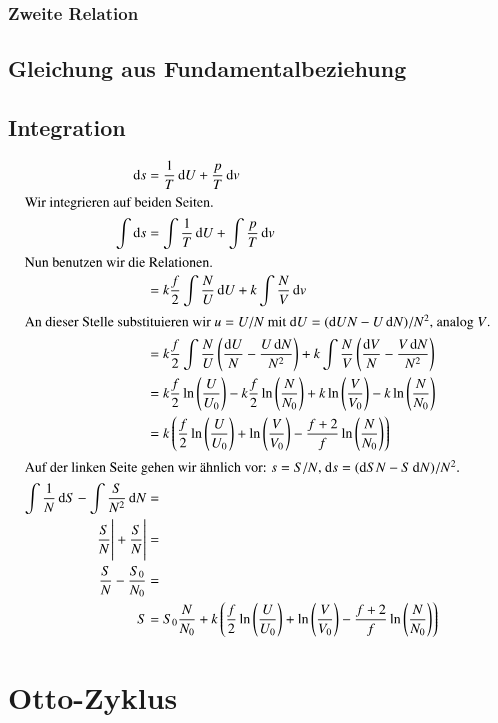 \subsubsection{Zweite Relation}

\subsection{Gleichung aus Fundamentalbeziehung}

\subsection{Integration}

\begin{align*}
    \dif s &= \frac 1T \dif U + \frac pT \dif v \\
    \intertext{%
        Wir integrieren auf beiden Seiten.
    }
    \int \dif s &= \int \frac 1T \dif U + \int \frac pT \dif v \\
    \intertext{%
        Nun benutzen wir die Relationen.
    }
    &= k \frac f2 \int \frac NU \dif U + k \int \frac NV \dif v \\
    \intertext{%
        An dieser Stelle substituieren wir $u = U/N$ mit $\dif U = (\dif U N -
        U \dif N)/N^2$, analog $V$.
    }
    &= k \frac f2 \int \frac NU \del{\frac{\dif U}{N} - \frac{U \dif N}{N^2}} + k \int \frac NV \del{\frac{\dif V}{N} - \frac{V \dif N}{N^2}} \\
    &= k \frac f2 \ln\del{\frac U{U_0}} - k \frac f2 \ln\del{\frac N{N_0}} + k \ln\del{\frac V{V_0}} - k \ln\del{\frac N{N_0}} \\
    &= k \del{\frac f2 \ln\del{\frac U{U_0}} + \ln\del{\frac V{V_0}} - \frac{f + 2}f \ln\del{\frac N{N_0}}} \\
    \intertext{%
        Auf der linken Seite gehen wir ähnlich vor: $s = S/N$, $\dif s = (\dif
        S N - S \dif N)/N^2$.
    }
    \int \frac 1N \dif S - \int \frac S{N^2} \dif N &= \\
    \eval{\frac SN} + \eval{\frac SN} &= \\
    \frac SN - \frac{S_0}{N_0} &= \\
    S &= S_0 \frac{N}{N_0} + k \del{\frac f2 \ln\del{\frac U{U_0}} + \ln\del{\frac V{V_0}} - \frac{f + 2}f \ln\del{\frac N{N_0}}}
\end{align*}

\section{Otto-Zyklus}

